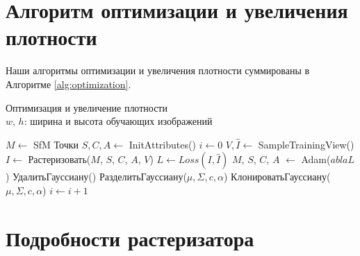 \begin{appendix}
    \section{Алгоритм оптимизации и увеличения плотности}
    Наши алгоритмы оптимизации и увеличения плотности суммированы в Алгоритме \ref{alg:optimization}.
    \begin{algorithm}[!h]
        \caption{Оптимизация и увеличение плотности\\
        $w$, $h$: ширина и высота обучающих изображений}
        \label{alg:optimization}
        \begin{algorithmic}
            \State $M \gets$ SfM Точки	
            \State $S, C, A \gets$ InitAttributes() 
            \State $i \gets 0$	
            \State $V, \hat{I} \gets$ SampleTrainingView()	
            \State $I \gets$ Растеризовать($M$, $S$, $C$, $A$, $V$)	
            \State $L \gets Loss(I, \hat{I}) $ 
            \State $M$, $S$, $C$, $A$ $\gets$ Adam($
abla L$) 
            	
            \State УдалитьГауссиану()	
            \EndIf
             
            	
            \State РазделитьГауссиану($\mu, \Sigma, c, \alpha$)
            \Else								{}
            \State КлонироватьГауссиану($\mu, \Sigma, c, \alpha$)
            \EndIf	
            \EndIf
            \EndFor		
            \EndIf
            \State $i \gets i+1$
            \EndWhile
        \end{algorithmic}
    \end{algorithm}
    \section{Подробности растеризатора}
    \label{app:raster}

\end{appendix}

